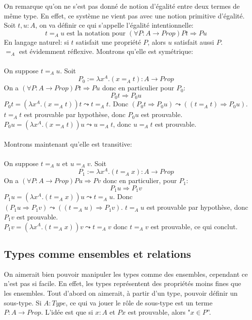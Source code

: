 \documentclass[a4paper,12pt]{article}
\theoremstyle{plain}
\begin{document}
On remarque qu'on ne s'est pas donné de notion d'égalité entre deux termes de même type. En effet, ce système ne vient pas avec une notion primitive d'égalité. Soit $t, u :A$, on va définir ce qui s'appelle l'égalité intentionnelle:
$$ t =_A u \text{ est la notation pour } (\forall P : A \to \mathit{Prop}) Pt \Rightarrow Pu$$
En langage naturel: si $t$ satisfait une propriété $P$, alors $u$ satisfait aussi $P$.\\ 

$=_A$ est évidemment réflexive. Montrons qu'elle est symétrique:\\
\\ 
On suppose $t =_A u$. Soit
$$P_0 := \lambda x^A. (x =_A t) : A \to \mathit{Prop}$$ 
On a $(\forall P : A \to \mathit{Prop}) Pt \Rightarrow Pu$ donc en particulier pour $P_0$: 
$$P_0 t \Rightarrow P_0 u$$
$P_0 t = (\lambda x^A.( x =_A t))t \leadsto t =_A t$. Donc $(P_0 t \Rightarrow P_0 u) \leadsto ((t =_A t) \Rightarrow P_0 u)$. $t =_A t$ est prouvable par hypothèse, donc $P_0 u$ est prouvable.\\
$P_0 u = (\lambda x^A.( x =_A t))u \leadsto u =_A t$, donc $ u =_A t$ est prouvable.\\ \\ 
Montrons maintenant qu'elle est transitive:\\ \\ 
On suppose $t =_A u$ et $u =_A v$. Soit
$$ P_1 := \lambda x^A. (t =_A x) : A \to \mathit{Prop}$$ 
On a $(\forall P : A \to \mathit{Prop}) Pu \Rightarrow Pv$ donc en particulier, pour $P_1$: 
$$P_1u \Rightarrow P_1v$$
$P_1 u = (\lambda x^A.( t =_A x))u \leadsto t =_A u$. Donc $(P_1 u \Rightarrow P_1 v) \leadsto ((t =_A u) \Rightarrow P_1 v)$. $t =_A u$ est prouvable par hypothèse, donc $P_1 v$ est prouvable.\\
$P_1 v = (\lambda x^A.( t =_A x))v \leadsto t =_A v$ donc $ t =_A v$ est prouvable, ce qui conclut.

\clearpage

\subsection{Types comme ensembles et relations}

On aimerait bien pouvoir manipuler les types comme des ensembles, cependant ce n'est pas si facile. En effet, les types représentent des propriétés moins fines que les ensembles. Tout d'abord on aimerait, à partir d'un type, pouvoir définir un sous-type. Si $A : \mathit{Type}$, ce qui va jouer le rôle de sous-type est un terme $P : A \to \mathit{Prop}$. L'idée est que si $x:A$ et $P x$ est prouvable, alors "$x \in P$''.\\
\end{document}
